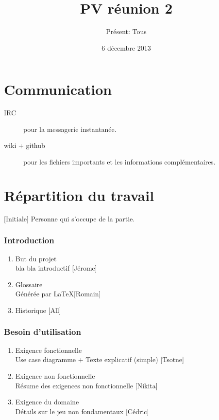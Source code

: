 \documentclass[a4paper,10pt]{article}
\author{Présent: Tous}
\title{PV réunion 2}
\date{6 décembre 2013}
\begin{document}
\maketitle
\part*{Communication}
\begin{description}
\item[IRC] pour la messagerie instantanée.
\item[wiki + github] pour les fichiers importants et les informations complémentaires.
\end{description}
\part*{Répartition du travail}
[Initiale] Personne qui s'occupe de la partie.
\section{Introduction}
\begin{enumerate}
    \item But du projet\\
        bla bla introductif [Jérome]
    \item Glossaire\\
        Générée par \LaTeX  [Romain]
    \item Historique [All]
\end{enumerate}
\section{Besoin d'utilisation}
\begin{enumerate}
    \item Exigence fonctionnelle\\
        Use case diagramme + Texte explicatif (simple) [Tsotne]
    \item Exigence non fonctionnelle\\
        Résume des exigences non fonctionnelle [Nikita]
    \item Exigence du domaine\\
        Détails sur le jeu non fondamentaux [Cédric]
\end{enumerate}
\end{document}
